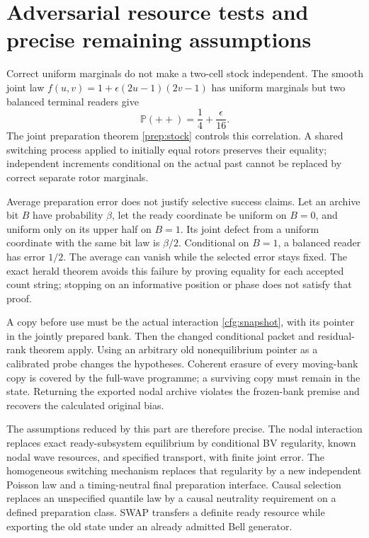 \documentclass[11pt,oneside,openany]{book}
\theoremstyle{definition}
\theoremstyle{remark}\newtheorem{remark}[theorem]{Remark}
\begin{document}
\section{Adversarial resource tests and precise remaining assumptions}

Correct uniform marginals do not make a two-cell stock independent.
The smooth joint law
$f(u,v)=1+\epsilon(2u-1)(2v-1)$ has uniform marginals but two
balanced terminal readers give
\[
 \mathbb P(++ )=\frac14+\frac{\epsilon}{16}.
\]
The joint preparation theorem \eqref{prep:stock} controls this correlation.
A shared switching process applied to initially equal rotors preserves
their equality; independent increments conditional on the actual past
cannot be replaced by correct separate rotor marginals.

Average preparation error does not justify selective success claims.
Let an archive bit $B$ have probability $\beta$, let the ready coordinate
be uniform on $B=0$, and uniform only on its upper half on $B=1$.
Its joint defect from a uniform coordinate with the same bit law is
$\beta/2$. Conditional on $B=1$, a balanced reader has error $1/2$.
The average can vanish while the selected error stays fixed.
The exact herald theorem avoids this failure by proving equality for
each accepted count string; stopping on an informative position or phase
does not satisfy that proof.

A copy before use must be the actual interaction
\eqref{cfg:snapshot}, with its pointer in the jointly prepared bank.
Then the changed conditional packet and residual-rank theorem apply.
Using an arbitrary old nonequilibrium pointer as a calibrated probe
changes the hypotheses. Coherent erasure of every moving-bank copy is
covered by the full-wave programme; a surviving copy must remain in
the state. Returning the exported nodal archive violates the frozen-bank
premise and recovers the calculated original bias.

The assumptions reduced by this part are therefore precise.
The nodal interaction replaces exact ready-subsystem equilibrium by
conditional BV regularity, known nodal wave resources, and specified
transport, with finite joint error. The homogeneous switching mechanism
replaces that regularity by a new independent Poisson law and a timing-neutral
final preparation interface. Causal selection replaces an unspecified
quantile law by a causal neutrality requirement on a defined preparation
class. SWAP transfers a definite ready resource while exporting the old
state under an already admitted Bell generator.
\end{document}

